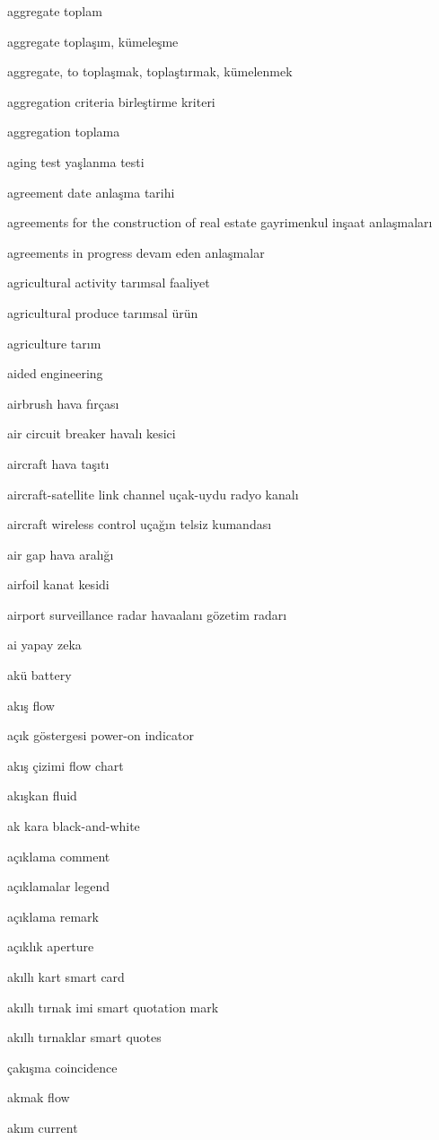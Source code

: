 \documentclass[12pt,fleqn]{article}\usepackage{../../common}
\begin{document}
aggregate toplam

aggregate toplaşım, kümeleşme

aggregate, to toplaşmak, toplaştırmak, kümelenmek

aggregation criteria birleştirme kriteri

aggregation toplama

aging test yaşlanma testi

agreement date anlaşma tarihi

agreements for the construction of real estate gayrimenkul inşaat anlaşmaları

agreements in progress devam eden anlaşmalar

agricultural activity tarımsal faaliyet

agricultural produce tarımsal ürün

agriculture tarım

aided engineering

airbrush hava fırçası

air circuit breaker havalı kesici

aircraft hava taşıtı

aircraft-satellite link channel uçak-uydu radyo kanalı

aircraft wireless control uçağın telsiz kumandası

air gap hava aralığı

airfoil kanat kesidi

airport surveillance radar havaalanı gözetim radarı

ai yapay zeka

akü battery

akış flow

açık göstergesi power-on indicator

akış çizimi flow chart

akışkan fluid

ak kara black-and-white

açıklama comment

açıklamalar legend

açıklama remark

açıklık aperture

akıllı kart smart card

akıllı tırnak imi smart quotation mark

akıllı tırnaklar smart quotes

çakışma coincidence

akmak flow

akım current
\end{document}
